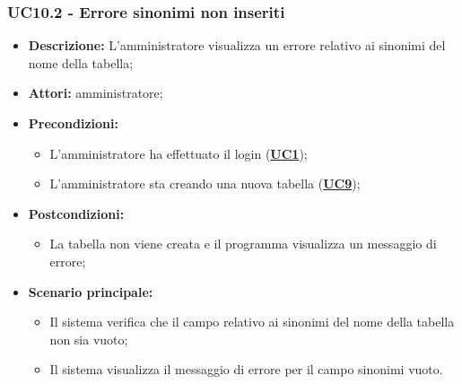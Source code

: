 \subsubsection{UC10.2 - Errore sinonimi non inseriti}
\label{sec:UC10.2}
\begin{itemize}
	\item \textbf{Descrizione:} L’amministratore visualizza un errore relativo ai sinonimi del nome della tabella;
	\item \textbf{Attori:} amministratore;
	\item \textbf{Precondizioni:} 
	\begin{itemize}
		\item L’amministratore ha effettuato il login (\hyperref[sec:UC1]{\textbf{UC1}});
		\item L’amministratore sta creando una nuova tabella (\hyperref[sec:UC9]{\textbf{UC9}});
	\end{itemize}
	\item \textbf{Postcondizioni:} 
	\begin{itemize}
		\item La tabella non viene creata e il programma visualizza un messaggio di errore;
	\end{itemize}
	\item \textbf{Scenario principale:} 
	\begin{itemize}
		\item Il sistema verifica che il campo relativo ai sinonimi del nome della tabella non sia vuoto;
		\item Il sistema visualizza il messaggio di errore per il campo sinonimi vuoto.
	\end{itemize}
\end{itemize}

